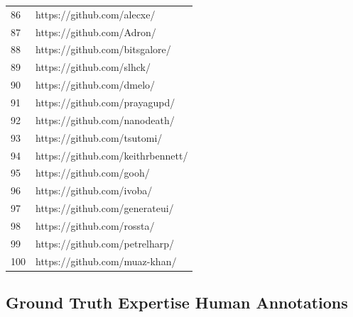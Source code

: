 \begin{center}
\begin{longtable}{|p{2cm}|p{7cm}|}
            86 & https://github.com/alecxe/ \\
            87 & https://github.com/Adron/ \\
            88 & https://github.com/bitsgalore/ \\
            89 & https://github.com/slhck/ \\
            90 & https://github.com/dmelo/ \\
            91 & https://github.com/prayagupd/ \\
            92 & https://github.com/nanodeath/ \\
            93 & https://github.com/tsutomi/ \\
            94 & https://github.com/keithrbennett/ \\
            95 & https://github.com/gooh/ \\
            96 & https://github.com/ivoba/ \\
            97 & https://github.com/generateui/ \\
            98 & https://github.com/rossta/ \\
            99 & https://github.com/petrelharp/ \\
            100 & https://github.com/muaz-khan/ \\
            
            \hline
            \end{longtable}
            \end{center}
        
    \subsection{Ground Truth Expertise Human Annotations\label{appendix:ground_truth_annotations}}
        
